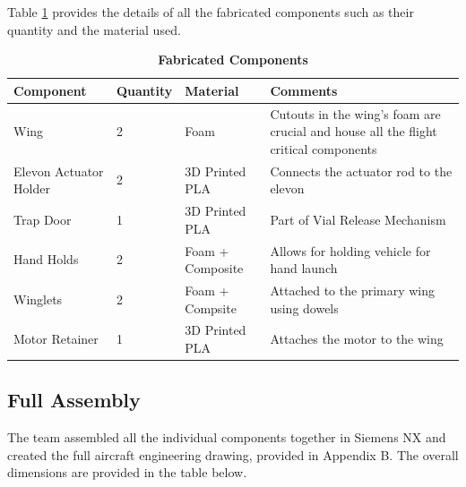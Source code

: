         Table \ref{table:fab_components} provides the details of all the fabricated components such as their quantity and the material used.
    
    
     \begin{table}[H]
         \begin{center}
         \caption{\textbf{Fabricated Components}} \label{table:fab_components}
         \begin{tabular}{|p{1.6in}|p{0.7in}|p{1in}|p{1.5in}|} %
             \hline \textbf{Component} & \textbf{Quantity} & \textbf{Material} & \textbf{Comments} \\ \hline %
             Wing & 2 & Foam & Cutouts in the wing's foam are crucial and house all the flight critical components \\ \hline
             Elevon Actuator Holder & 2 & 3D Printed PLA & Connects the actuator rod to the elevon \\ \hline
             Trap Door & 1 & 3D Printed PLA & Part of Vial Release Mechanism \\ \hline
             Hand Holds & 2 & Foam + Composite & Allows for holding vehicle for hand launch \\ \hline
             Winglets & 2 & Foam + Compsite & Attached to the primary wing using dowels \\  \hline
             Motor Retainer & 1 & 3D Printed PLA & Attaches the motor to the wing \\ \hline
             
             
         \end{tabular}
         \end{center}
     \end{table}
    
    \subsection{Full Assembly}
    
    The team assembled all the individual components together in Siemens NX and created the full aircraft engineering drawing, provided in Appendix B. The overall dimensions are provided in the table below.
    

